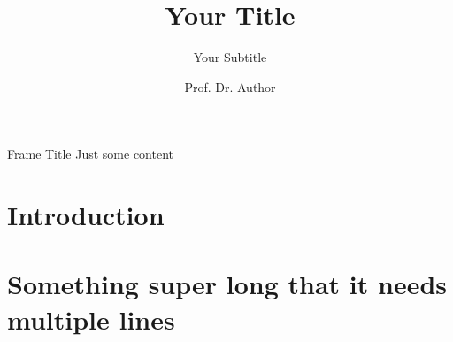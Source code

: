 \documentclass[aspectratio=169]{beamer}
\author{Prof. Dr. Author}
\title{Your Title}
\subtitle{Your Subtitle}
\begin{document}
\maketitle

\begin{frame}{Frame Title}
Just some content
\end{frame}

\part{Introduction}

\partpage


\part{Something super long that it needs multiple lines}
\frame[plain]{\partpage}

\end{document}
